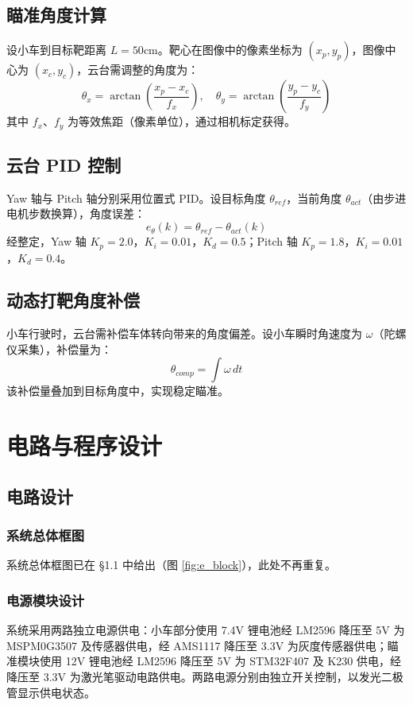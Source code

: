 \documentclass[zihao=-4,fontset=none]{ctexart}
\begin{document}
\subsection{瞄准角度计算}
设小车到目标靶距离 $L=50\text{cm}$。靶心在图像中的像素坐标为 $(x_p, y_p)$，图像中心为 $(x_c, y_c)$，云台需调整的角度为：
\begin{equation}
    \theta_x = \arctan\left(\frac{x_p - x_c}{f_x}\right), \quad \theta_y = \arctan\left(\frac{y_p - y_c}{f_y}\right)
\end{equation}
其中 $f_x$、$f_y$ 为等效焦距（像素单位），通过相机标定获得。

\subsection{云台 PID 控制}
Yaw 轴与 Pitch 轴分别采用位置式 PID。设目标角度 $\theta_{ref}$，当前角度 $\theta_{act}$（由步进电机步数换算），角度误差：
\begin{equation}
    e_\theta(k) = \theta_{ref} - \theta_{act}(k)
\end{equation}
经整定，Yaw 轴 $K_p=2.0$，$K_i=0.01$，$K_d=0.5$；Pitch 轴 $K_p=1.8$，$K_i=0.01$，$K_d=0.4$。

\subsection{动态打靶角度补偿}
小车行驶时，云台需补偿车体转向带来的角度偏差。设小车瞬时角速度为 $\omega$（陀螺仪采集），补偿量为：
\begin{equation}
    \theta_{comp} = \int \omega \, dt
\end{equation}
该补偿量叠加到目标角度中，实现稳定瞄准。

\section{电路与程序设计}

\subsection{电路设计}

\subsubsection{系统总体框图}
系统总体框图已在 §1.1 中给出（图 \ref{fig:e_block}），此处不再重复。

\subsubsection{电源模块设计}
系统采用两路独立电源供电：小车部分使用 7.4V 锂电池经 LM2596 降压至 5V 为 MSPM0G3507 及传感器供电，经 AMS1117 降压至 3.3V 为灰度传感器供电；瞄准模块使用 12V 锂电池经 LM2596 降压至 5V 为 STM32F407 及 K230 供电，经降压至 3.3V 为激光笔驱动电路供电。两路电源分别由独立开关控制，以发光二极管显示供电状态。
\end{document}

